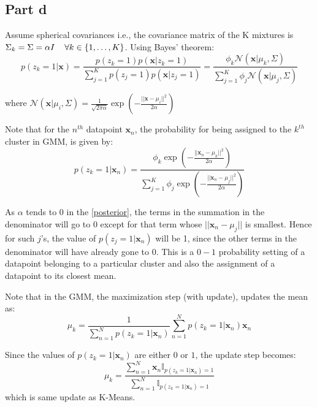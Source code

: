 \documentclass{article}
\newcommand{\xbold}{\mathbf{x}}
\newcommand{\ind}{\mathbb{I}}
\begin{document}
\subsection*{Part d}
\begin{flushleft}
Assume spherical covariances i.e., the covariance matrix of the K mixtures is \(\Sigma_{k} = \Sigma = \alpha I \hspace{4mm} \forall k \in \{1, \ldots, K\}\). Using Bayes' theorem:
\begin{equation}
p(z_{k} = 1 | \xbold) = \frac{p(z_{k} = 1)p(\xbold | z_{k} = 1)}{\displaystyle \sum_{j=1}^{K} p(z_{j} = 1)p(\mathbf{x} | z_{j} = 1)} = \frac{\phi_{k}\mathcal{N}(\xbold | \mu_{k}, \Sigma)}{\displaystyle \sum_{j=1}^{K} \phi_{j}\mathcal{N}(\mathbf{x} | \mu_{j}, \Sigma)}
\end{equation}

where \(\mathcal{N}(\mathbf{x} | \mu_{i}, \Sigma) = \frac{1}{\sqrt{2\pi\alpha}}\exp\left(-\frac{||\xbold - \mu_{i}||^{2}}{2\alpha}\right) \)

Note that for the \(n^{th}\) datapoint \(\xbold_{n}\), the probability for being assigned to the \(k^{th}\) cluster in GMM, is given by: 
\begin{equation}
\label{posterior}
p(z_{k} = 1 | \xbold_{n}) = \frac{\phi_{k}\exp\left(-\frac{||\xbold_{n} - \mu_{k}||^{2}}{2\alpha}\right)}{\displaystyle \sum_{j=1}^{K} \phi_{j}\exp\left(-\frac{||\xbold_{n} - \mu_{j}||^{2}}{2\alpha}\right)}
\end{equation}

As \(\alpha\) tends to \(0\) in the \ref{posterior}, the terms in the summation in the denominator will go to 0 except for that term whose \(||\xbold_{n} - \mu_{j}||\) is smallest. Hence for such \(j\)'s, the value of \(p(z_{j} = 1 | \xbold_{n})\) will be 1, since the other terms in the denominator will have already gone to \(0\). This is a \(0-1\) probability setting of a datapoint belonging to a particular cluster and also the assignment of a datapoint to its closest mean.

Note that in the GMM, the maximization step (with update), updates the mean as:
\begin{equation}
\mu_{k} = \frac{1}{\displaystyle \sum_{n=1}^{N}p(z_{k} = 1 | \xbold_{n})} \displaystyle \sum_{n=1}^{N}p(z_{k} = 1 | \xbold_{n})\xbold_{n}
\end{equation}

Since the values of \(p(z_{k} = 1 | \xbold_{n})\) are either \(0\) or \(1\), the update step becomes: 
\begin{equation}
\mu_{k} = \frac{\displaystyle \sum_{n=1}^{N} \xbold_{n} \ind_{p(z_{k} = 1 | \xbold_{n}) = 1}}{\displaystyle \sum_{n=1}^{N} \ind_{p(z_{k} = 1 | \xbold_{n}) = 1}}
\end{equation} which is same update as K-Means.


\end{flushleft}
\end{document}
